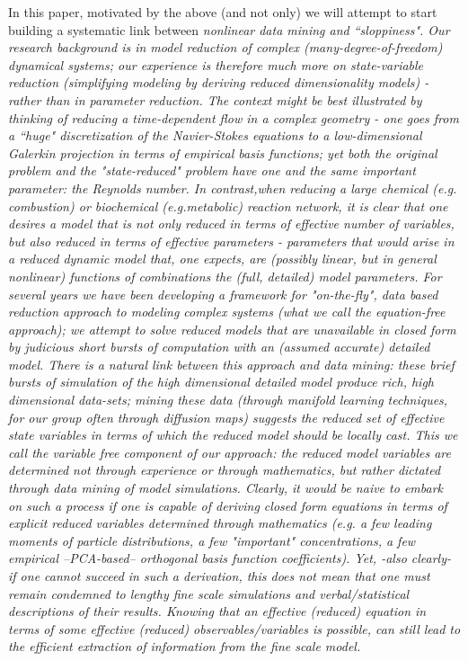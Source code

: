 \documentclass{article}
\begin{document}
In this paper, motivated by the above (and not only) we will attempt to start building a
systematic link between \em{nonlinear} data mining and ``sloppiness".
%
Our research background is in model reduction of complex (many-degree-of-freedom) dynamical systems;
our experience is therefore much more on state-variable reduction
(simplifying modeling by deriving reduced dimensionality models) - rather than in \em{parameter reduction}.
%
The context might be best illustrated by thinking of reducing a time-dependent
flow in a complex geometry - one goes from a ``huge" discretization of the Navier-Stokes equations to a
low-dimensional Galerkin projection in terms of empirical basis functions;
yet both the original problem and the "state-reduced" problem have \em{one and the same} important parameter:
the Reynolds number.
%
In contrast,when reducing a large chemical (e.g. combustion) or biochemical (e.g.metabolic) reaction network, it is clear
that one desires a model that is not only reduced in terms of effective number of variables,
but also reduced in terms of effective parameters - parameters that would arise in a
reduced dynamic model that, one expects, are (possibly linear, but in general nonlinear) functions of
combinations the (full, detailed) model parameters.
%
For several years we have been developing a framework for "on-the-fly", data based reduction approach to
modeling complex systems (what we call the equation-free approach);
we attempt to solve reduced models that are unavailable in closed form by
judicious short bursts of computation with an (assumed accurate) detailed model.
%
There is a natural link between this approach and data mining: these brief bursts
of simulation of the high dimensional detailed model produce rich, high dimensional
data-sets; mining these data (through manifold learning techniques, for our group often through diffusion maps)
suggests the reduced set of \em{effective state variables} in terms of which the reduced model should be locally cast.
%
This we call the \em{variable free} component of our approach: the reduced model variables are
determined not through experience or through mathematics, but rather dictated through data mining of model simulations.
%
Clearly, it would be naive to embark on such a process if one is capable of deriving closed form equations in
terms of explicit reduced variables determined through mathematics (e.g. a few leading moments of particle distributions,
a few "important" concentrations, a few empirical --PCA-based-- orthogonal basis function coefficients).
%
Yet, -also clearly- if one cannot succeed in such a derivation, this does not mean that one must
remain condemned to lengthy fine scale simulations and verbal/statistical descriptions of their results.
%
Knowing that an effective (reduced) equation in terms of some effective (reduced) observables/variables is
possible, can still lead to the efficient extraction of information from the fine scale model.
\end{document}
